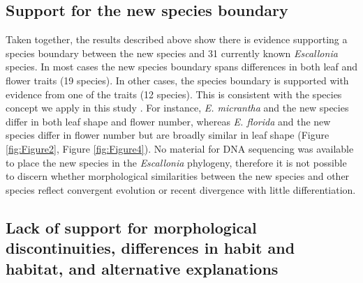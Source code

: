 \documentclass[fleqn,10pt,lineno]{wlpeerj} %
\begin{document}
\subsection*{Support for the new species boundary}

Taken together, the results described above show there is evidence supporting a species boundary between the new species and 31 currently known \emph{Escallonia} species. In most cases the new species boundary spans differences in both leaf and flower traits (19 species). In other cases, the species boundary is supported with evidence from one of the traits (12 species). This is consistent with the species concept we apply in this study \citep{deQueiroz:2007di}. For instance, \emph{E. micrantha} and the new species differ in both leaf shape and flower number, whereas \emph{E. florida} and the new species differ in flower number but are broadly similar in leaf shape (Figure \ref{fig:Figure2}, Figure \ref{fig:Figure4}). No material for DNA sequencing was available to place the new species in the \emph{Escallonia} phylogeny, therefore it is not possible to discern whether morphological similarities between the new species and other species reflect convergent evolution or recent divergence with little differentiation.

\subsection*{Lack of support for morphological discontinuities, differences in habit and habitat, and  alternative explanations}
\end{document}
